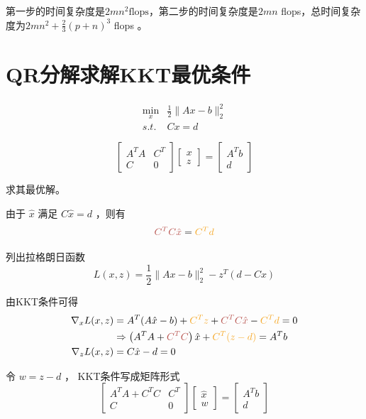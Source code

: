 第一步的时间复杂度是$2 m n^{2}  \text{flops} $，第二步的时间复杂度是$2 {mn} $ flops，总时间复杂度为$ 2 m n^{2}+\frac{2}{3}(p+n)^{3} $ flops 。

\section{QR分解求解KKT最优条件}

\begin{problem}
    $$\begin{aligned}
        \min _{x} & \frac{1}{2}\|A x-b\|_{2}^{2}\\
        s.t. & C x=d
    \end{aligned}$$

    $$
\left[\begin{array}{cc}
A^{T} A & C^{T} \\
C & 0
\end{array}\right]\left[\begin{array}{l}
x \\
z
\end{array}\right]=\left[\begin{array}{c}
A^{T} b \\
d
\end{array}\right]
$$

求其最优解。
\end{problem}


由于 $ \hat{x} $ 满足 $ C \hat{x}=d $ ，则有 $$\displaystyle \textcolor[rgb]{0.72,0.33,0.31}{C^{T} C\hat{x}} =\textcolor[rgb]{0.96,0.65,0.14}{C^{T} d}$$ 

列出拉格朗日函数
$$
L(x, z)=\frac{1}{2}\|A x-b\|_{2}^{2}-z^{T}(d-C x)
$$

由KKT条件可得
$$\begin{aligned}
    \nabla _{x} L(x,z) & =A^{T} (A\hat{x} -b)+\textcolor[rgb]{0.96,0.65,0.14}{C^{T} z} +\textcolor[rgb]{0.72,0.33,0.31}{C^{T} C\hat{x}} -\textcolor[rgb]{0.96,0.65,0.14}{C^{T} d} =0\\
     & \Rightarrow \left( A^{T} A+\textcolor[rgb]{0.72,0.33,0.31}{C^{T} C}\right)\hat{x} +\textcolor[rgb]{0.96,0.65,0.14}{C^{T} (z-d)} =A^{T} b\\
    \nabla _{z} L(x,z) & =C\hat{x} -d=0
    \end{aligned}
$$

令 $ w=z-d $ ， KKT条件写成矩阵形式
$$
\left[\begin{array}{cc}
A^{T} A+C^{T} C & C^{T} \\
C & 0
\end{array}\right]\left[\begin{array}{l}
\hat{x} \\
w
\end{array}\right]=\left[\begin{array}{c}
A^{T} b \\
d
\end{array}\right]
$$

